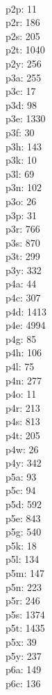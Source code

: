 \begin{multicols}{8}
  \\p2p: 11
  \\p2r: 186
  \\p2s: 205
  \\p2t: 1040
  \\p2y: 256
  \\p3a: 255
  \\p3c: 17
  \\p3d: 98
  \\p3e: 1330
  \\p3f: 30
  \\p3h: 143
  \\p3k: 10
  \\p3l: 69
  \\p3n: 102
  \\p3o: 26
  \\p3p: 31
  \\p3r: 766
  \\p3s: 870
  \\p3t: 299
  \\p3y: 332
  \\p4a: 44
  \\p4c: 307
  \\p4d: 1413
  \\p4e: 4994
  \\p4g: 85
  \\p4h: 106
  \\p4l: 75
  \\p4n: 277
  \\p4o: 11
  \\p4r: 213
  \\p4s: 813
  \\p4t: 205
  \\p4w: 26
  \\p4y: 342
  \\p5a: 93
  \\p5c: 94
  \\p5d: 592
  \\p5e: 843
  \\p5g: 540
  \\p5k: 18
  \\p5l: 134
  \\p5m: 147
  \\p5n: 223
  \\p5r: 246
  \\p5s: 1374
  \\p5t: 1435
  \\p5x: 39
  \\p5y: 237
  \\p6a: 149
  \\p6c: 136

\end{multicols}
